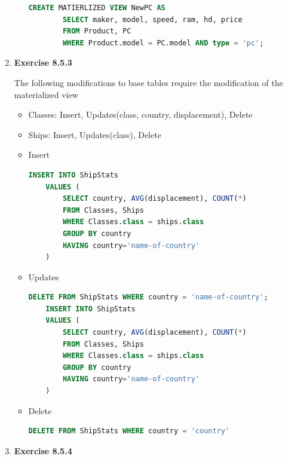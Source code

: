 \documentclass[12pt]{article}
\begin{document}
\begin{enumerate}[1.]
\begin{itemize}
    \begin{lstlisting}[language=SQL]
    CREATE MATIERLIZED VIEW NewPC AS
        SELECT maker, model, speed, ram, hd, price
        FROM Product, PC
        WHERE Product.model = PC.model AND type = 'pc';
    \end{lstlisting}

    \end{itemize}

    \item \textbf{Exercise 8.5.3}

    The following modifications to base tables require the modification of the
    materialized view

    \begin{itemize}
        \item Classes: Insert, Updates(class, country, displacement), Delete
        \item Ships: Insert, Updates(class), Delete
    \end{itemize}

    \begin{itemize}
        \item Insert

    \begin{lstlisting}[language=SQL]
    INSERT INTO ShipStats
    VALUES (
        SELECT country, AVG(displacement), COUNT(*)
        FROM Classes, Ships
        WHERE Classes.class = ships.class
        GROUP BY country
        HAVING country='name-of-country'
    )
    \end{lstlisting}

        \item Updates

    \begin{lstlisting}[language=SQL]
    DELETE FROM ShipStats WHERE country = 'name-of-country';
    INSERT INTO ShipStats
    VALUES (
        SELECT country, AVG(displacement), COUNT(*)
        FROM Classes, Ships
        WHERE Classes.class = ships.class
        GROUP BY country
        HAVING country='name-of-country'
    )
    \end{lstlisting}

        \item Delete

    \begin{lstlisting}[language=SQL]
    DELETE FROM ShipStats WHERE country = 'country'
    \end{lstlisting}

    \end{itemize}

    \item \textbf{Exercise 8.5.4}

\end{enumerate}
\end{document}
